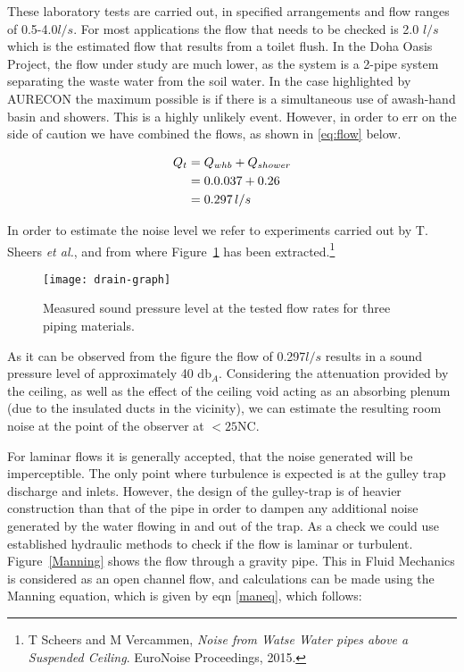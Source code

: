 These laboratory tests are carried out, in specified arrangements and flow ranges of 0.5-4.0\thinspace$l/s$. For most applications the flow that needs to be checked is 2.0 $l/s$ which is the estimated flow that results from a toilet flush. In the Doha Oasis Project, the flow under study are much lower, as the system is a 2-pipe system separating the waste water from the soil water. In the case highlighted by AURECON the maximum possible is if there is a simultaneous use of awash-hand basin and showers. This is a highly unlikely event. However, in order to err on the side of caution we have combined the flows, as shown in \eqref{eq:flow} below.


\begin{align}
Q_t &= Q_{whb} + Q_{shower} \\
     &= 0.0.037 + 0.26\\
     &= 0.297\thinspace l/s \label{eq:flow}
\end{align}

In order to estimate the noise level we refer to experiments carried out by T. Sheers \textit{et al.}, and from where Figure~\ref{fig:graph} has been extracted.\footnote{T Scheers and M Vercammen, \textit{Noise from Watse Water pipes above a Suspended Ceiling}. EuroNoise Proceedings, 2015.}

\begin{figure}[htbp]
\centering

\texttt{[image: drain-graph]}
\caption{Measured sound pressure level at the tested flow rates for three piping materials. }
\label{fig:graph}
\end{figure}

As it can be observed from the figure the flow of 0.297\thinspace$l/s$ results in a sound pressure level of approximately 40 db$_A$. Considering the attenuation provided by the ceiling, as well as the effect of the ceiling void acting as an absorbing plenum (due to the insulated ducts in the vicinity), we can estimate the resulting room noise at the point of the observer at $<25$\thinspace NC. 


For laminar flows it is generally accepted, that the noise generated will be imperceptible. The only point where turbulence is expected is at the gulley trap discharge and inlets. However, the design of the gulley-trap is of heavier construction than that of the pipe in order to dampen any additional noise generated by the water flowing in and out of the trap. As a check we could use established hydraulic methods to check if the flow is laminar or turbulent. Figure~\ref{Manning} shows the flow through a gravity pipe. This in Fluid Mechanics is considered as an open channel flow, and calculations can be made using the Manning equation, which is given by eqn \eqref{maneq}, which follows:

